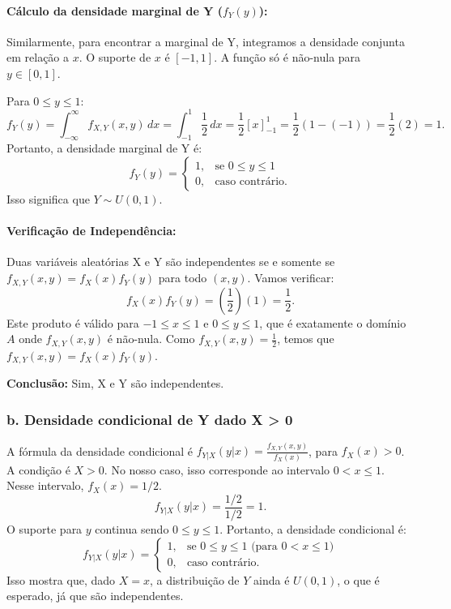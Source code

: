 \documentclass[12pt]{article}
\begin{document}
\paragraph{Cálculo da densidade marginal de Y ($f_Y(y)$):}
Similarmente, para encontrar a marginal de Y, integramos a densidade conjunta em relação a $x$. O suporte de $x$ é $[-1, 1]$. A função só é não-nula para $y \in [0, 1]$.

Para $0 \le y \le 1$:
\[ f_Y(y) = \int_{-\infty}^{\infty} f_{X,Y}(x,y) \,dx = \int_{-1}^{1} \frac{1}{2} \,dx = \frac{1}{2} [x]_{-1}^{1} = \frac{1}{2}(1 - (-1)) = \frac{1}{2}(2) = 1. \]
Portanto, a densidade marginal de Y é:
\[ f_Y(y) = \begin{cases} 1, & \text{se } 0 \le y \le 1 \\ 0, & \text{caso contrário.} \end{cases} \]
Isso significa que $Y \sim U(0, 1)$.

\paragraph{Verificação de Independência:}
Duas variáveis aleatórias X e Y são independentes se e somente se $f_{X,Y}(x,y) = f_X(x)f_Y(y)$ para todo $(x,y)$.
Vamos verificar:
\[ f_X(x)f_Y(y) = \left(\frac{1}{2}\right)(1) = \frac{1}{2}. \]
Este produto é válido para $-1 \le x \le 1$ e $0 \le y \le 1$, que é exatamente o domínio $A$ onde $f_{X,Y}(x,y)$ é não-nula. Como $f_{X,Y}(x,y) = \frac{1}{2}$, temos que $f_{X,Y}(x,y) = f_X(x)f_Y(y)$.

\textbf{Conclusão:} Sim, X e Y são independentes.

\subsubsection*{b. Densidade condicional de Y dado X > 0}
A fórmula da densidade condicional é $f_{Y|X}(y|x) = \frac{f_{X,Y}(x,y)}{f_X(x)}$, para $f_X(x) > 0$.
A condição é $X > 0$. No nosso caso, isso corresponde ao intervalo $0 < x \le 1$. Nesse intervalo, $f_X(x) = 1/2$.
\[ f_{Y|X}(y|x) = \frac{1/2}{1/2} = 1. \]
O suporte para $y$ continua sendo $0 \le y \le 1$.
Portanto, a densidade condicional é:
\[ f_{Y|X}(y|x) = \begin{cases} 1, & \text{se } 0 \le y \le 1 \text{ (para } 0 < x \le 1\text{)} \\ 0, & \text{caso contrário.} \end{cases} \]
Isso mostra que, dado $X=x$, a distribuição de $Y$ ainda é $U(0,1)$, o que é esperado, já que são independentes.
\end{document}
